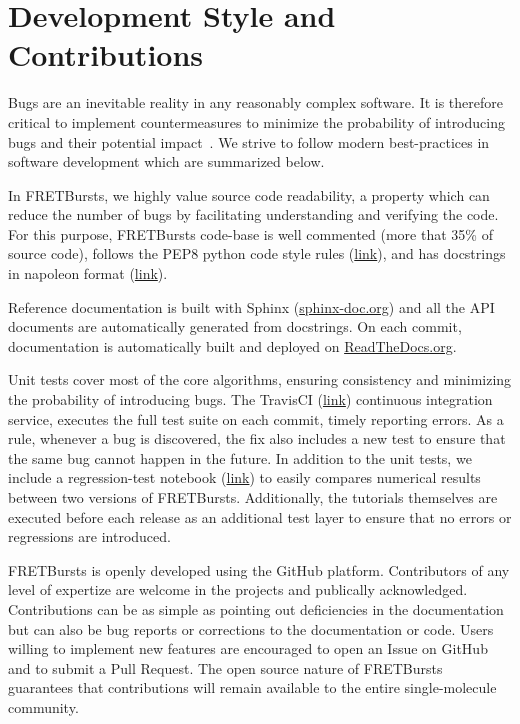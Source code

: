 \section{Development Style and Contributions}

Bugs are an inevitable reality in any reasonably complex software. It is 
therefore critical to implement countermeasures to
minimize the probability of introducing bugs and their potential impact~\cite{Prli__2012, Wilson_2014}.
We strive to follow modern best-practices in software development which are summarized 
below.

In FRETBursts, we highly value source code readability, a property which can 
reduce the number of bugs by facilitating understanding and verifying the code.
For this purpose, FRETBursts code-base is well commented (more that 35\%
of source code), 
follows the PEP8 python code style rules (\href{https://www.python.org/dev/peps/pep-0008/}{link}),
and has docstrings in napoleon format (\href{http://sphinxcontrib-napoleon.readthedocs.org/}{link}).

Reference documentation is built with Sphinx (\href{http://sphinx-doc.org/}{sphinx-doc.org})
and all the API documents are automatically generated from docstrings.
On each commit, documentation is automatically built and deployed on
\href{https://readthedocs.org/}{ReadTheDocs.org}.

Unit tests cover most of the core algorithms, ensuring consistency and
minimizing the probability of introducing bugs. 
The TravisCI (\href{http://travis-ci.org}{link}) continuous integration service, 
executes the full test suite on each commit, timely reporting errors.
As a rule, whenever a bug is discovered, the  fix also includes a new test
to ensure that the same bug cannot happen in the future.
In addition to the unit tests, we include a regression-test notebook
(\href{https://github.com/tritemio/FRETBursts/blob/master/notebooks/dev/tests/FRETBursts\%20-\%20Regression\%20tests.ipynb}{link})
to easily compares numerical results between two versions of FRETBursts. 
Additionally, the tutorials themselves are executed before each release as
an additional test layer to ensure that no errors or regressions are introduced.

FRETBursts is openly developed using the GitHub platform.
Contributors of any level of expertize are welcome in the projects
and publically acknowledged.
Contributions can be as simple as pointing out deficiencies in the 
documentation but can also be bug reports or corrections to 
the documentation or code. Users willing to implement
new features are encouraged to open an Issue on GitHub and to submit
a Pull Request. The open source nature of FRETBursts guarantees that
contributions will remain available to the entire single-molecule 
community.

